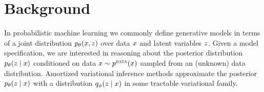 \documentclass{article}
\theoremstyle{definition}
\begin{document}
\vspace{-0.5em}
\section{Background}
\label{sec:background}


In probabilistic machine learning we commonly define generative models in terms of a joint distribution $p_\theta(x, z)$ over data $x$ and latent variables $z$. Given a model specification, we are interested in reasoning about the posterior distribution $p_\theta(z \mid x)$ conditioned on data $x \sim p^\textsc{data}(x)$ sampled from an (unknown) data distribution. Amortized variational inference methods approximate the posterior $p_\theta(z \mid x)$ with a distribution $q_\phi(z \mid x)$ in some tractable variational family.
\end{document}
